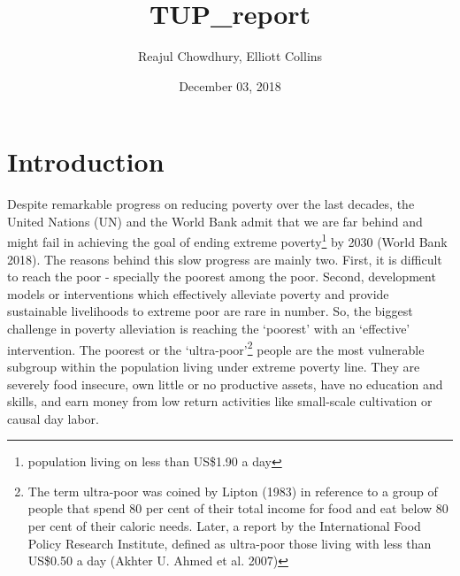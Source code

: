 \documentclass[]{article}
\title{TUP\_report}
\author{Reajul Chowdhury, Elliott Collins}
\date{December 03, 2018}
\let\rmarkdownfootnote\footnote%
\def\footnote{\protect\rmarkdownfootnote}
\begin{document}
\maketitle

\section{Introduction}\label{introduction}

Despite remarkable progress on reducing poverty over the last decades,
the United Nations (UN) and the World Bank admit that we are far behind
and might fail in achieving the goal of ending extreme poverty\footnote{population
  living on less than US\$1.90 a day} by 2030 (World Bank 2018). The
reasons behind this slow progress are mainly two. First, it is difficult
to reach the poor - specially the poorest among the poor. Second,
development models or interventions which effectively alleviate poverty
and provide sustainable livelihoods to extreme poor are rare in number.
So, the biggest challenge in poverty alleviation is reaching the
`poorest' with an `effective' intervention. The poorest or the
`ultra-poor'\footnote{The term ultra-poor was coined by Lipton (1983) in
  reference to a group of people that spend 80 per cent of their total
  income for food and eat below 80 per cent of their caloric needs.
  Later, a report by the International Food Policy Research Institute,
  defined as ultra-poor those living with less than US\$0.50 a day
  (Akhter U. Ahmed et al. 2007)} people are the most vulnerable subgroup
within the population living under extreme poverty line. They are
severely food insecure, own little or no productive assets, have no
education and skills, and earn money from low return activities like
small-scale cultivation or causal day labor.
\end{document}
